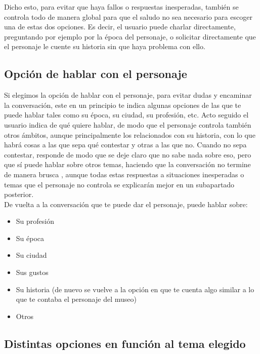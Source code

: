 Dicho esto, para evitar que haya fallos o respuestas inesperadas, también se controla todo de manera global para que el saludo no sea necesario para escoger una de estas dos opciones. Es decir, el usuario puede charlar directamente, preguntando por ejemplo por la época del personaje, o solicitar directamente que el personaje le cuente su historia sin que haya problema con ello. 


\subsection*{Opción de hablar con el personaje}

Si elegimos la opción de hablar con el personaje, para evitar dudas y encaminar la conversación, este en un principio te indica algunas opciones de las que te puede hablar tales como su época, su ciudad, su profesión, etc. Acto seguido el usuario indica de qué quiere hablar, de modo que el personaje controla también otros ámbitos, aunque principalmente los relacionados con su historia, con lo que habrá cosas a las que sepa qué contestar y otras a las que no. Cuando no sepa contestar, responde de modo que se deje claro que no sabe nada sobre eso, pero que sí puede hablar sobre otros temas, haciendo que la conversación no termine de manera brusca , aunque todas estas respuestas a situaciones inesperadas o temas que el personaje no controla se explicarán mejor en un subapartado posterior. \\

De vuelta a la conversación que te puede dar el personaje, puede hablar sobre: 

\begin{itemize}
	\item Su profesión
	
	\item Su época
	
	\item Su ciudad
	
	\item Sus gustos
	
	\item Su historia (de nuevo se vuelve a la opción en que te cuenta algo similar a lo que te contaba el personaje del museo)
	
	\item Otros
	
\end{itemize}

\subsection*{Distintas opciones en función al tema elegido}

